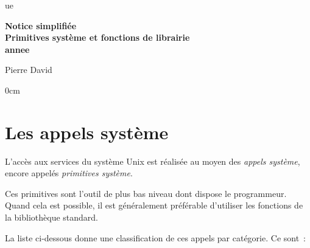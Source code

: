\documentclass [twoside] {report}
\newcommand {\tassertoc} {{ \setlength {\parskip} {0cm} \tableofcontents }}
\begin{document}
\thispagestyle {empty}

\begin {titlepage}
     {ue}

    \vfill

    \begin {center}
	\huge\bf
	Notice simplifiée \\
	\vspace* {5mm}
	Primitives système et fonctions de librairie \\
	\vspace* {5mm}
	 {annee}
    \end {center}

    \vfill

    \begin {flushright}
	Pierre David
    \end {flushright}
\end {titlepage}

\cleardoublepage
\tassertoc



% 
% 




\cleardoublepage

\chapter {Les appels système}


L'accès aux services du système Unix est réalisée
au moyen des {\it appels système}, encore appelés
{\it primitives système}.

Ces primitives sont l'outil de plus bas niveau
dont dispose le programmeur. Quand cela est
possible, il est généralement préférable d'utiliser
les fonctions de la bibliothèque standard.


La liste ci-dessous donne une classification de
ces appels par catégorie. Ce sont~:
\end{document}
